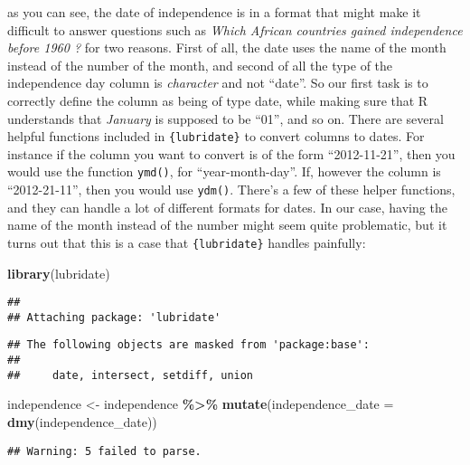 \documentclass[
]{article}
\newenvironment{Shaded}{\begin{snugshade}}{\end{snugshade}}
\newcommand{\DataTypeTok}[1]{\textcolor[rgb]{0.13,0.29,0.53}{#1}}
\newcommand{\KeywordTok}[1]{\textcolor[rgb]{0.13,0.29,0.53}{\textbf{#1}}}
\newcommand{\NormalTok}[1]{#1}
\newcommand{\OperatorTok}[1]{\textcolor[rgb]{0.81,0.36,0.00}{\textbf{#1}}}
\newcommand{\StringTok}[1]{\textcolor[rgb]{0.31,0.60,0.02}{#1}}
\begin{document}
as you can see, the date of independence is in a format that might make it difficult to answer questions
such as \emph{Which African countries gained independence before 1960 ?} for two reasons. First of all,
the date uses the name of the month instead of the number of the month, and second of all the type of
the independence day column is \emph{character} and not ``date''. So our first task is to correctly define the column
as being of type date, while making sure that R understands that \emph{January} is supposed to be ``01'', and so
on. There are several helpful functions included in \texttt{\{lubridate\}} to convert columns to dates. For instance
if the column you want to convert is of the form ``2012-11-21'', then you would use the function \texttt{ymd()},
for ``year-month-day''. If, however the column is ``2012-21-11'', then you would use \texttt{ydm()}. There's
a few of these helper functions, and they can handle a lot of different formats for dates. In our case,
having the name of the month instead of the number might seem quite problematic, but it turns out
that this is a case that \texttt{\{lubridate\}} handles painfully:

\begin{Shaded}
\begin{Highlighting}[]
\KeywordTok{library}\NormalTok{(lubridate)}
\end{Highlighting}
\end{Shaded}

\begin{verbatim}
## 
## Attaching package: 'lubridate'
\end{verbatim}

\begin{verbatim}
## The following objects are masked from 'package:base':
## 
##     date, intersect, setdiff, union
\end{verbatim}

\begin{Shaded}
\begin{Highlighting}[]
\NormalTok{independence \textless{}{-}}\StringTok{ }\NormalTok{independence }\OperatorTok{\%\textgreater{}\%}
\StringTok{  }\KeywordTok{mutate}\NormalTok{(}\DataTypeTok{independence\_date =} \KeywordTok{dmy}\NormalTok{(independence\_date))}
\end{Highlighting}
\end{Shaded}

\begin{verbatim}
## Warning: 5 failed to parse.
\end{verbatim}
\end{document}
